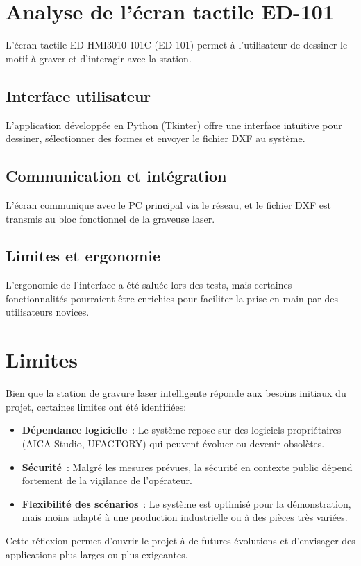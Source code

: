 \section{Analyse de l’écran tactile ED-101}
L’écran tactile ED-HMI3010-101C (ED-101) permet à l’utilisateur de dessiner le motif à graver et d’interagir avec la station.
\subsection{Interface utilisateur}
L’application développée en Python (Tkinter) offre une interface intuitive pour dessiner, sélectionner des formes et envoyer le fichier DXF au système.
\subsection{Communication et intégration}
L’écran communique avec le PC principal via le réseau, et le fichier DXF est transmis au bloc fonctionnel de la graveuse laser.
\subsection{Limites et ergonomie}
L’ergonomie de l’interface a été saluée lors des tests, mais certaines fonctionnalités pourraient être enrichies pour faciliter la prise en main par des utilisateurs novices.

\section{Limites}
Bien que la station de gravure laser intelligente réponde aux besoins initiaux du projet, certaines limites ont été identifiées:
\begin{itemize}
    \item \textbf{Dépendance logicielle} : Le système repose sur des logiciels propriétaires (AICA Studio, UFACTORY) qui peuvent évoluer ou devenir obsolètes.
    \item \textbf{Sécurité} : Malgré les mesures prévues, la sécurité en contexte public dépend fortement de la vigilance de l'opérateur.
    \item \textbf{Flexibilité des scénarios} : Le système est optimisé pour la démonstration, mais moins adapté à une production industrielle ou à des pièces très variées.
\end{itemize}

Cette réflexion permet d'ouvrir le projet à de futures évolutions et d'envisager des applications plus larges ou plus exigeantes.



